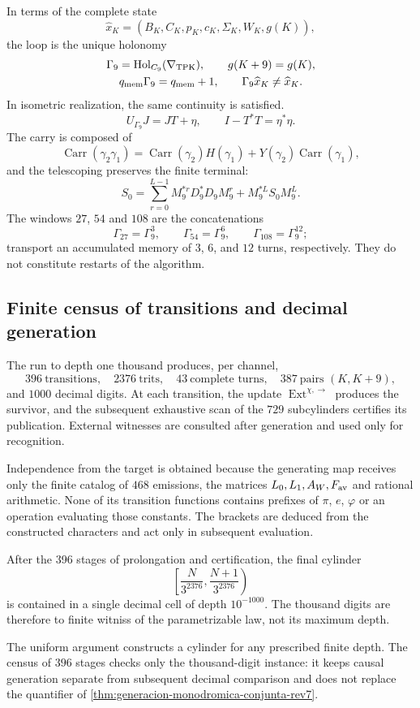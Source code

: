 In terms of the complete state
\[
 \widehat x_K=(B_K,C_K,p_K,c_K,\Sigma_K,W_K,g(K)),
\]
the loop is the unique holonomy
\[
 \begin{gathered}
 \Gamma_9=\operatorname{Hol}_{C_9}(\nabla_{\rm TPK}),
 \qquad g(K+9)=g(K),\\
 q_{\rm mem}\Gamma_9=q_{\rm mem}+1,
 \qquad \Gamma_9\widehat x_K\ne\widehat x_K.
 \end{gathered}
\]
In isometric realization, the same continuity is satisfied.
\[
 U_{\Gamma_9}J=JT+\eta,\qquad
 I-T^*T=\eta^*\eta.
\]
The carry is composed of
\[
 \operatorname{Carr}(\gamma_2\gamma_1)
 =\operatorname{Carr}(\gamma_2)H(\gamma_1)
 +Y(\gamma_2)\operatorname{Carr}(\gamma_1),
\]
and the telescoping preserves the finite terminal:
\[
 S_0=\sum_{r=0}^{L-1}M_9^{*r}D_9^*D_9M_9^r
     +M_9^{*L}S_0M_9^L.
\]
The windows \(27\), \(54\) and \(108\) are the concatenations
\[
 \Gamma_{27}=\Gamma_9^3,\qquad
 \Gamma_{54}=\Gamma_9^6,\qquad
 \Gamma_{108}=\Gamma_9^{12};
\]
transport an accumulated memory of \(3\), \(6\), and \(12\) turns,
respectively. They do not constitute restarts of the algorithm.

\subsection{Finite census of transitions and decimal generation}

The run to depth one thousand produces, per channel,
\[
396\ \text{transitions},\quad
2376\ \text{trits},\quad
43\ \text{complete turns},\quad
387\ \text{pairs }(K,K+9),
\]
and \(1000\) decimal digits. At each transition, the update
\(\operatorname{Ext}^{\chi,\rightarrow}\) produces the survivor, and the
subsequent exhaustive scan of the \(729\) subcylinders certifies its
publication. External witnesses are consulted after generation and
used only for recognition.

Independence from the target is obtained because the generating map receives
only the finite catalog of \(468\) emissions, the matrices
\(L_0,L_1,A_W,F_{\rm av}\) and rational arithmetic. None of its transition
functions contains prefixes of \(\pi\), \(e\), \(\varphi\) or an
operation evaluating those constants. The brackets are deduced from the
constructed characters and act only in subsequent evaluation.

After the 396 stages of prolongation and certification, the final cylinder
\[
 \left[\frac{N}{3^{2376}},\frac{N+1}{3^{2376}}\right)
\]
is contained in a single decimal cell of depth \(10^{-1000}\).
The thousand digits are therefore to finite witniss of the parametrizable law, not
its maximum depth.

The uniform argument constructs a cylinder for any prescribed finite
depth. The census of \(396\) stages checks only the thousand-digit
instance: it keeps causal generation separate from subsequent decimal comparison
and does not replace the quantifier of
\cref{thm:generacion-monodromica-conjunta-rev7}.
